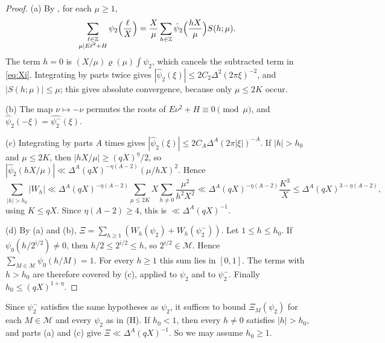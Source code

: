 \documentclass[11pt]{amsart}
\theoremstyle{remark}
\theoremstyle{definition}
\numberwithin{equation}{section}
\newcommand{\Mset}{\mathcal{M}}
\newcommand{\Z}{\mathbb{Z}}
\begin{document}
\begin{proof}
(a) By \cite[(6.4)]{II}, for each $\mu\ge1$,
\[
\sum_{\substack{\ell\in\Z\\ \mu\mid E\ell^2+H}}\psi_2\Bigl(\frac\ell X\Bigr)=\frac X\mu\sum_{h\in\Z}\hat\psi_2\Bigl(\frac{hX}\mu\Bigr)S(h;\mu).
\]
The term $h=0$ is $(X/\mu)\varrho(\mu)\int\psi_2$, which cancels the subtracted term in \eqref{eq:Xi}. Integrating by parts twice gives $|\hat\psi_2(\xi)|\le2C_2\Delta^2(2\pi\xi)^{-2}$, and $|S(h;\mu)|\le\mu$; this gives absolute convergence, because only $\mu\le2K$ occur.

(b) The map $\nu\mapsto-\nu$ permutes the roots of $E\nu^2+H\equiv0\pmod\mu$, and $\hat\psi_2(-\xi)=\widehat{\psi_2^-}(\xi)$.

(c) Integrating by parts $A$ times gives $|\hat\psi_2(\xi)|\le2C_A\Delta^A(2\pi|\xi|)^{-A}$. If $|h|>h_0$ and $\mu\le2K$, then $|hX/\mu|\ge(qX)^\eta/2$, so $|\hat\psi_2(hX/\mu)|\ll\Delta^A(qX)^{-\eta(A-2)}(\mu/hX)^2$. Hence
\[
\sum_{|h|>h_0}|W_h|\ll\Delta^A(qX)^{-\eta(A-2)}\sum_{\mu\le2K}X\sum_{h\ne0}\frac{\mu^2}{h^2X^2}\ll\Delta^A(qX)^{-\eta(A-2)}\frac{K^3}{X}\le\Delta^A(qX)^{3-\eta(A-2)},
\]
using $K\le qX$. Since $\eta(A-2)\ge4$, this is $\ll\Delta^A(qX)^{-1}$.

(d) By (a) and (b), $\Xi=\sum_{h\ge1}(W_h(\psi_2)+W_h(\psi_2^-))$. Let $1\le h\le h_0$. If $\psi_0(h/2^{i/2})\ne0$, then $h/2\le2^{i/2}\le h$, so $2^{i/2}\in\Mset$. Hence $\sum_{M\in\Mset}\psi_0(h/M)=1$. For every $h\ge1$ this sum lies in $[0,1]$. The terms with $h>h_0$ are therefore covered by (c), applied to $\psi_2$ and to $\psi_2^-$. Finally $h_0\le(qX)^{1+\eta}$.
\end{proof}

Since $\psi_2^-$ satisfies the same hypotheses as $\psi_2$, it suffices to bound $\Xi_M(\psi_2)$ for each $M\in\Mset$ and every $\psi_2$ as in (H). If $h_0<1$, then every $h\ne0$ satisfies $|h|>h_0$, and parts (a) and (c) give $\Xi\ll\Delta^A(qX)^{-1}$. So we may assume $h_0\ge1$.
\end{document}
